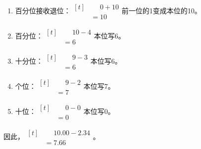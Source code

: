{\begin{enumerate}[leftmargin=1.7em,itemsep=5pt,topsep=0pt]
\item 百分位接收退位：\(\begin{aligned}[t]&\phantom{={}}0+10\\&=10\end{aligned}\)\quad 前一位的1变成本位的10。
\item 百分位：\(\begin{aligned}[t]&\phantom{={}}10-4\\&=6\end{aligned}\)\quad 本位写6。
\item 十分位：\(\begin{aligned}[t]&\phantom{={}}9-3\\&=6\end{aligned}\)\quad 本位写6。
\item 个位：\(\begin{aligned}[t]&\phantom{={}}9-2\\&=7\end{aligned}\)\quad 本位写7。
\item 十位：\(\begin{aligned}[t]&\phantom{={}}0-0\\&=0\end{aligned}\)\quad 本位写0。
\end{enumerate}
\par\smallskip
因此，\(\begin{aligned}[t]&\phantom{={}}10.00-2.34\\&=7.66\end{aligned}\)。
\par\medskip

}
